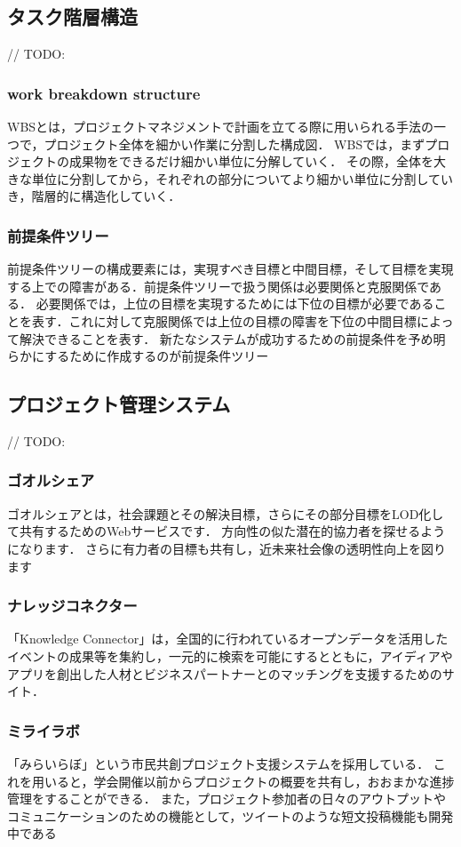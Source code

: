 \subsection{タスク階層構造}
// TODO:

\subsubsection{work breakdown structure}
WBSとは，プロジェクトマネジメントで計画を立てる際に用いられる手法の一つで，プロジェクト全体を細かい作業に分割した構成図．
WBSでは，まずプロジェクトの成果物をできるだけ細かい単位に分解していく．
その際，全体を大きな単位に分割してから，それぞれの部分についてより細かい単位に分割していき，階層的に構造化していく．

\subsubsection{前提条件ツリー}
前提条件ツリーの構成要素には，実現すべき目標と中間目標，そして目標を実現する上での障害がある．前提条件ツリーで扱う関係は必要関係と克服関係である．
必要関係では，上位の目標を実現するためには下位の目標が必要であることを表す．これに対して克服関係では上位の目標の障害を下位の中間目標によって解決できることを表す．
新たなシステムが成功するための前提条件を予め明らかにするために作成するのが前提条件ツリー

\subsection{プロジェクト管理システム}
// TODO:

\subsubsection{ゴオルシェア}
ゴオルシェア\cite{shiramatsu2016}とは，社会課題とその解決目標，さらにその部分目標をLOD化して共有するためのWebサービスです．
方向性の似た潜在的協力者を探せるようになります．
さらに有力者の目標も共有し，近未来社会像の透明性向上を図ります

\subsubsection{ナレッジコネクター}
「Knowledge Connector」は，全国的に行われているオープンデータを活用したイベントの成果等を集約し，一元的に検索を可能にするとともに，アイディアやアプリを創出した人材とビジネスパートナーとのマッチングを支援するためのサイト．

\subsubsection{ミライラボ}
「みらいらぼ」という市民共創プロジェクト支援システムを採用している．
これを用いると，学会開催以前からプロジェクトの概要を共有し，おおまかな進捗管理をすることができる．
また，プロジェクト参加者の日々のアウトプットやコミュニケーションのための機能として，ツイートのような短文投稿機能も開発中である

